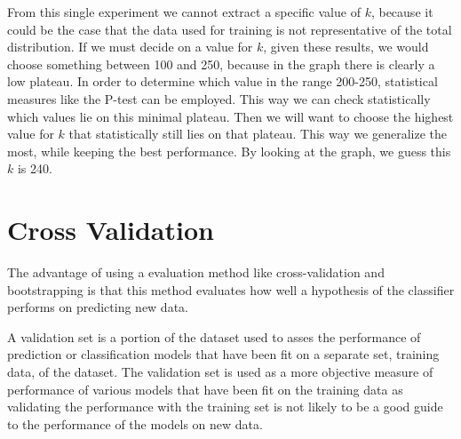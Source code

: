 \documentclass[a4paper]{article}
\begin{document}
From this single experiment we cannot extract a specific value of $k$, because it could be the case that the data used for training is not representative of the total distribution. 
If we must decide on a value for $k$, given these results, we would choose something between 100 and 250, because in the graph there is clearly a low plateau. In order to determine which value in the range 200-250, statistical measures like the P-test can be employed. This way we can check statistically which values lie on this minimal plateau. Then we will want to choose the highest value for $k$ that statistically still lies on that plateau. This way we generalize the most, while keeping the best performance. By looking at the graph, we guess this $k$ is 240.

\section{Cross Validation}
The advantage of using a evaluation method like cross-validation and bootstrapping is that this method evaluates how well a hypothesis of the classifier performs on predicting new data.

A validation set is a portion of the dataset used to asses the performance of prediction or classification models that have been fit on a separate set, training data, of the dataset. The validation set is used as a more objective measure of performance of various models that have been fit on the training data as validating the performance with the training set is not likely to be a good guide to the performance of the models on new data.
\end{document}
